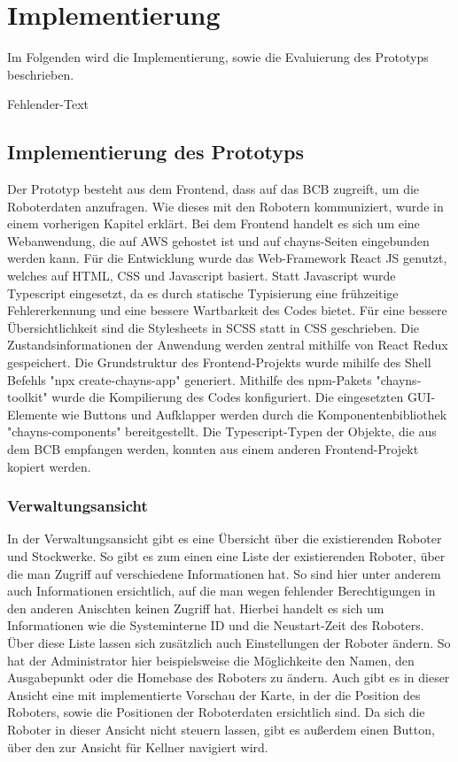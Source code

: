 \newpage
\section{Implementierung}
Im Folgenden wird die Implementierung, sowie die Evaluierung des Prototyps beschrieben.

Fehlender-Text

\subsection{Implementierung des Prototyps}
Der Prototyp besteht aus dem Frontend, dass auf das \ac{BCB} zugreift, um die Roboterdaten anzufragen. Wie dieses mit den Robotern kommuniziert, wurde in einem vorherigen Kapitel erklärt. %
Bei dem Frontend handelt es sich um eine Webanwendung, die auf AWS gehostet ist und auf chayns-Seiten eingebunden werden kann. Für die Entwicklung wurde das Web-Framework React JS genutzt, welches auf HTML, CSS und Javascript basiert. Statt Javascript wurde Typescript eingesetzt, da es durch statische Typisierung eine frühzeitige Fehlererkennung und eine bessere Wartbarkeit des Codes bietet. Für eine bessere Übersichtlichkeit sind die Stylesheets in SCSS statt in CSS geschrieben. Die Zustandsinformationen der Anwendung werden zentral mithilfe von React Redux gespeichert. Die Grundstruktur des Frontend-Projekts wurde mihilfe des Shell Befehls "npx create-chayns-app" generiert. Mithilfe des npm-Pakets "chayns-toolkit" wurde die Kompilierung des Codes konfiguriert. Die eingesetzten GUI-Elemente wie Buttons und Aufklapper werden durch die Komponentenbibliothek "chayns-components" bereitgestellt. Die Typescript-Typen der Objekte, die aus dem \ac{BCB} empfangen werden, konnten aus einem anderen Frontend-Projekt kopiert werden.

\subsubsection{Verwaltungsansicht}
In der Verwaltungsansicht gibt es eine Übersicht über die existierenden Roboter und Stockwerke. So gibt es zum einen eine Liste der existierenden Roboter, über die man Zugriff auf verschiedene Informationen hat. So sind hier unter anderem auch Informationen ersichtlich, auf die man wegen fehlender Berechtigungen in den anderen Anischten keinen Zugriff hat. Hierbei handelt es sich um Informationen wie die Systeminterne \ac{ID} und die Neustart-Zeit des Roboters. Über diese Liste lassen sich zusätzlich auch Einstellungen der Roboter ändern. So hat der Administrator hier beispielsweise die Möglichkeite den Namen, den Ausgabepunkt oder die Homebase des Roboters zu ändern. Auch gibt es in dieser Ansicht eine mit \deckgl{} implementierte Vorschau der Karte, in der die Position des Roboters, sowie die Positionen der Roboterdaten ersichtlich sind. Da sich die Roboter in dieser Ansicht nicht steuern lassen, gibt es außerdem einen Button, über den zur Ansicht für Kellner navigiert wird.

